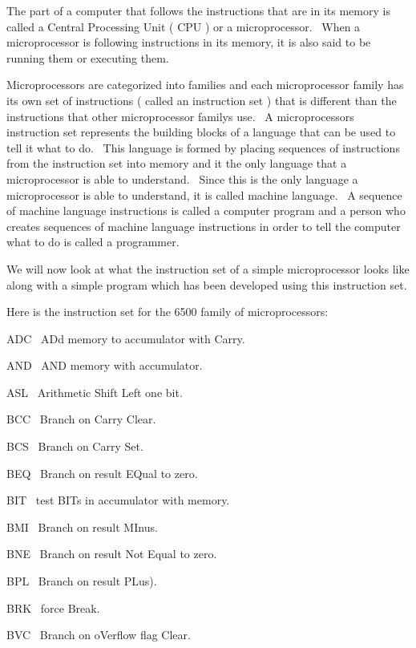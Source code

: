 \documentclass[12pt,twoside]{book}
\begin{document}
\bigskip

The part of a computer that follows the instructions that are in its memory is called a Central Processing Unit ( CPU ) or a microprocessor. \ When a microprocessor is following instructions in its memory, it is also said to be running them or executing them. 

\bigskip

Microprocessors are categorized into families and each microprocessor family has its own set of instructions ( called an instruction set ) that is different than the instructions that other microprocessor family{\textquotesingle}s use. \ A microprocessor{\textquotesingle}s instruction set represents the building blocks of a language that can be used to tell it what to do. \ This language is formed by placing sequences of instructions from the instruction set into memory and it the only language that a microprocessor is able to understand. \ Since this is the only language a microprocessor is able to understand, it is called machine language. \ A sequence of machine language instructions is called a computer program and a person who creates sequences of machine language instructions in order to tell the computer what to do is called a programmer. 

\bigskip

We will now look at what the instruction set of a simple microprocessor looks like along with a simple program which has been developed using this instruction set. 

\bigskip

Here is the instruction set for the 6500 family of microprocessors:


\bigskip

ADC \ ADd memory to accumulator with Carry.

AND \ AND memory with accumulator.

ASL \ Arithmetic Shift Left one bit.

BCC \ Branch on Carry Clear.

BCS \ Branch on Carry Set.

BEQ \ Branch on result EQual to zero.

BIT \ test BITs in accumulator with memory.

BMI \ Branch on result MInus.

BNE \ Branch on result Not Equal to zero.

BPL \ Branch on result PLus).

BRK \ force Break.

BVC \ Branch on oVerflow flag Clear.
\end{document}
